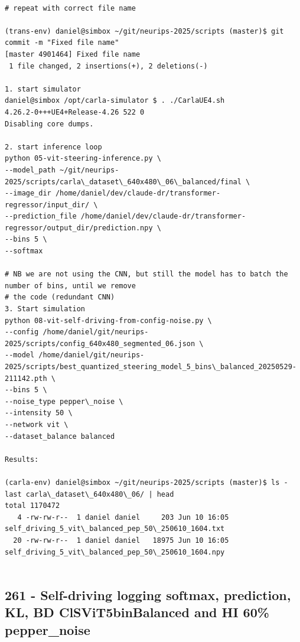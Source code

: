 \begin{verbatim}

# repeat with correct file name

(trans-env) daniel@simbox ~/git/neurips-2025/scripts (master)$ git commit -m "Fixed file name"
[master 4901464] Fixed file name
 1 file changed, 2 insertions(+), 2 deletions(-)
 
1. start simulator
daniel@simbox /opt/carla-simulator $ . ./CarlaUE4.sh 
4.26.2-0+++UE4+Release-4.26 522 0
Disabling core dumps.

2. start inference loop
python 05-vit-steering-inference.py \
--model_path ~/git/neurips-2025/scripts/carla\_dataset\_640x480\_06\_balanced/final \
--image_dir /home/daniel/dev/claude-dr/transformer-regressor/input_dir/ \
--prediction_file /home/daniel/dev/claude-dr/transformer-regressor/output_dir/prediction.npy \
--bins 5 \
--softmax

# NB we are not using the CNN, but still the model has to batch the number of bins, until we remove
# the code (redundant CNN)
3. Start simulation
python 08-vit-self-driving-from-config-noise.py \
--config /home/daniel/git/neurips-2025/scripts/config_640x480_segmented_06.json \
--model /home/daniel/git/neurips-2025/scripts/best_quantized_steering_model_5_bins\_balanced_20250529-211142.pth \
--bins 5 \
--noise_type pepper\_noise \
--intensity 50 \
--network vit \
--dataset_balance balanced

Results:

(carla-env) daniel@simbox ~/git/neurips-2025/scripts (master)$ ls -last carla\_dataset\_640x480\_06/ | head
total 1170472
   4 -rw-rw-r--  1 daniel daniel     203 Jun 10 16:05 self_driving_5_vit\_balanced_pep_50\_250610_1604.txt
  20 -rw-rw-r--  1 daniel daniel   18975 Jun 10 16:05 self_driving_5_vit\_balanced_pep_50\_250610_1604.npy


\end{verbatim}

\subsection{261 - Self-driving logging softmax, prediction, KL, BD ClSViT5binBalanced and HI 60\% pepper\_noise}
\label{app_res:261}

